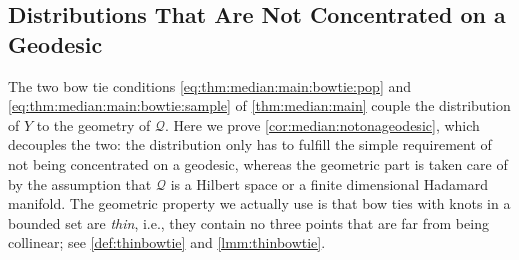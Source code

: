 \documentclass{article}
\newcommand*{\mc}[1]{\mathcal{#1}}
\begin{document}
\subsection{Distributions That Are Not Concentrated on a Geodesic}\label{ssec:proof:median:geodesic}
%
The two bow tie conditions \eqref{eq:thm:median:main:bowtie:pop} and \eqref{eq:thm:median:main:bowtie:sample} of \cref{thm:median:main} couple the distribution of $Y$ to the geometry of $\mc Q$. Here we prove \cref{cor:median:notonageodesic}, which decouples the two: the distribution only has to fulfill the simple requirement of not being concentrated on a geodesic, whereas the geometric part is taken care of by the assumption that $\mc Q$ is a Hilbert space or a finite dimensional Hadamard manifold. The geometric property we actually use is that bow ties with knots in a bounded set are \emph{thin}, i.e., they contain no three points that are far from being collinear; see \cref{def:thinbowtie} and \cref{lmm:thinbowtie}.
\end{document}
